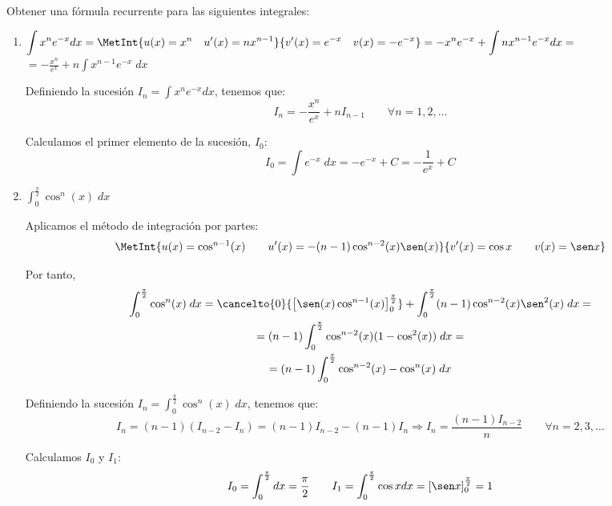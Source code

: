 \begin{ejercicio}\label{Ej3} Obtener una fórmula recurrente para las siguientes integrales:
    \begin{enumerate}
        \item $\displaystyle
            \int x^n e^{-x} dx = \MetInt{u(x)=x^n \quad u'(x)=nx^{n-1}}{v'(x)=e^{-x}\quad v(x)=-e^{-x}} = -x^ne^{-x} +\int nx^{n-1}e^{-x}dx =$\\$=\displaystyle-\frac{x^n}{e^x} +n\int x^{n-1}e^{-x}\;dx$

        Definiendo la sucesión $I_n=\int x^n e^{-x}dx$, tenemos que:
        \begin{equation*}
            I_n = -\frac{x^n}{e^x} +nI_{n-1} \qquad \forall n=1,2,\dots
        \end{equation*}
            
        Calculamos el primer elemento de la sucesión, $I_0$:
        \begin{equation*}
            I_0 = \int e^{-x}\;dx = -e^{-x}+C = -\frac{1}{e^x}+C
        \end{equation*}

        \item $\displaystyle \int_0^{\frac{\pi}{2}}\cos^n (x)\;dx$

        Aplicamos el método de integración por partes:
        \begin{equation*}
            \MetInt{u(x)=\cos^{n-1}(x) \qquad u'(x)=-(n-1)\cos^{n-2}(x)\sen(x)}{v'(x)=\cos x \qquad v(x)=\sen x}
        \end{equation*}

        Por tanto,
        \begin{multline*}
            \int_0^{\frac{\pi}{2}}\cos^n (x)\;dx
            = \cancelto{0}{\left[\sen(x)\cos^{n-1}(x)\right]_0^{\frac{\pi}{2}}}
            + \int_0^{\frac{\pi}{2}} (n-1)\cos^{n-2}(x)\sen^2(x)\;dx =
            \\=
            (n-1) \int_0^{\frac{\pi}{2}} \cos^{n-2}(x)(1-\cos^2(x))\;dx =
            \\=
            (n-1)\int_0^{\frac{\pi}{2}} \cos^{n-2}(x)-\cos^n(x)\;dx
        \end{multline*}

        Definiendo la sucesión $I_n=\int_0^{\frac{\pi}{2}}\cos^n (x)\;dx$, tenemos que:
        \begin{equation*}
            I_n = (n-1)(I_{n-2}-I_n) = (n-1)I_{n-2} -(n-1)I_n \Longrightarrow I_n = \frac{(n-1)I_{n-2}}{n} \qquad \forall n=2,3,\dots
        \end{equation*}

        Calculamos $I_0$ y $I_1$:
        \begin{equation*}
            I_0 = \int_{0}^{\frac{\pi}{2}} dx = \frac{\pi}{2}
            \qquad
            I_1 = \int_{0}^{\frac{\pi}{2}} \cos x dx = \left[\sen x\right]_0^{\frac{\pi}{2}}
            = 1
        \end{equation*}
    \end{enumerate}
\end{ejercicio}


